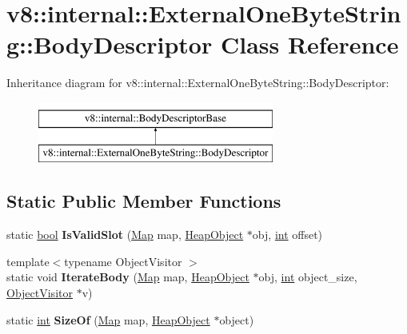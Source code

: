 \hypertarget{classv8_1_1internal_1_1ExternalOneByteString_1_1BodyDescriptor}{}\section{v8\+:\+:internal\+:\+:External\+One\+Byte\+String\+:\+:Body\+Descriptor Class Reference}
\label{classv8_1_1internal_1_1ExternalOneByteString_1_1BodyDescriptor}
Inheritance diagram for v8\+:\+:internal\+:\+:External\+One\+Byte\+String\+:\+:Body\+Descriptor\+:\begin{figure}[H]
\begin{center}
\leavevmode
\includegraphics[height=2.000000cm]{classv8_1_1internal_1_1ExternalOneByteString_1_1BodyDescriptor}
\end{center}
\end{figure}
\subsection*{Static Public Member Functions}
\begin{DoxyCompactItemize}
\item 
\mbox{\label{classv8_1_1internal_1_1ExternalOneByteString_1_1BodyDescriptor_ae036156efda5fd88c04bf9fde3aa06ec}} 
static \mbox{\hyperlink{classbool}{bool}} {\bfseries Is\+Valid\+Slot} (\mbox{\hyperlink{classv8_1_1internal_1_1Map}{Map}} map, \mbox{\hyperlink{classv8_1_1internal_1_1HeapObject}{Heap\+Object}} $\ast$obj, \mbox{\hyperlink{classint}{int}} offset)
\item 
\mbox{\label{classv8_1_1internal_1_1ExternalOneByteString_1_1BodyDescriptor_af2320cf8af69fa40879978bd4bbafc52}} 
{\footnotesize template$<$typename Object\+Visitor $>$ }\\static void {\bfseries Iterate\+Body} (\mbox{\hyperlink{classv8_1_1internal_1_1Map}{Map}} map, \mbox{\hyperlink{classv8_1_1internal_1_1HeapObject}{Heap\+Object}} $\ast$obj, \mbox{\hyperlink{classint}{int}} object\+\_\+size, \mbox{\hyperlink{classv8_1_1internal_1_1ObjectVisitor}{Object\+Visitor}} $\ast$v)
\item 
\mbox{\label{classv8_1_1internal_1_1ExternalOneByteString_1_1BodyDescriptor_ad92aec88c13bc8edba0381f264b45217}} 
static \mbox{\hyperlink{classint}{int}} {\bfseries Size\+Of} (\mbox{\hyperlink{classv8_1_1internal_1_1Map}{Map}} map, \mbox{\hyperlink{classv8_1_1internal_1_1HeapObject}{Heap\+Object}} $\ast$object)
\end{DoxyCompactItemize}
